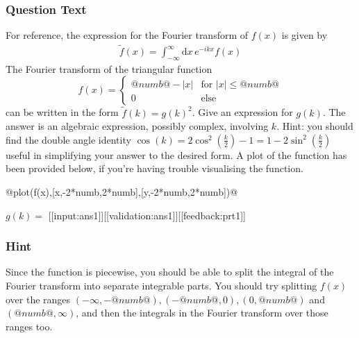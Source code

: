 \documentclass[a4paper,10pt]{article}
\begin{document}
\subsubsection{Question Text}
For reference, the expression for the Fourier transform of $f(x)$ is given by \begin{align*}
\tilde{f}(x) = \int_{-\infty}^{\infty} \text{d}x \, e^{-ikx}f(x)
\end{align*}
The Fourier transform of the triangular function \[ f(x) = \begin{cases} @numb@-|x| & \text{for } |x| \leq @numb@\\ 0 & \text{else} \end{cases} \] can be written in the form \(\tilde{f}(k) = g(k)^2\). Give an expression for \(g(k)\). The answer is an algebraic expression, possibly complex, involving $k$. Hint: you should find the double angle identity \(\cos(k) = 2\cos^2(\frac{k}{2}) -1 = 1 - 2\sin^2(\frac{k}{2})\) useful in simplifying your answer to the desired form. A plot of the function has been provided below, if you're having trouble visualising the function.

@plot(f(x),[x,-2*numb,2*numb],[y,-2*numb,2*numb])@

\(g(k) = \) [[input:ans1]][[validation:ans1]][[feedback:prt1]]
\subsubsection{Hint}
Since the function is piecewise, you should be able to split the integral of the Fourier transform into separate integrable parts. You should try splitting \(f(x)\) over the ranges \((-\infty,-@numb@),(-@numb@,0),(0,@numb@)\) and \((@numb@,\infty)\), and then the integrals in the Fourier transform over those ranges too.
\end{document}
